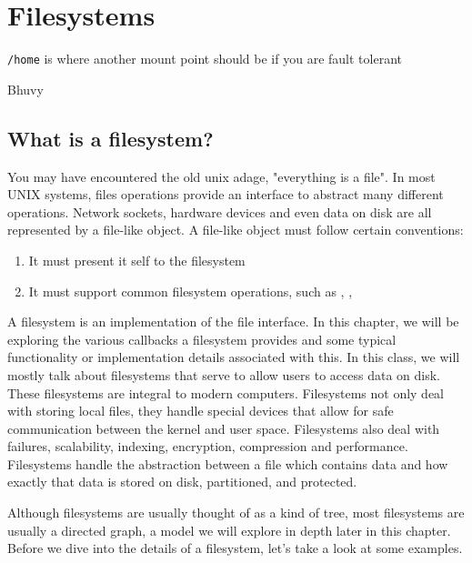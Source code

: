\chapter{Filesystems}

\epigraph{\texttt{/home} is where another mount point should be if you are fault tolerant}{Bhuvy}

\section{What is a filesystem?}

You may have encountered the old unix adage, "everything is a file". In most UNIX systems, files operations provide an interface to abstract many different operations. Network sockets, hardware devices and even data on disk are all represented by a file-like object. A file-like object must follow certain conventions:

\begin{enumerate}
  \item It must present it self to the filesystem
  \item It must support common filesystem operations, such as , , 
\end{enumerate}

A filesystem is an implementation of the file interface. In this chapter, we will be exploring the various callbacks a filesystem provides and some typical functionality or implementation details associated with this. In this class, we will mostly talk about filesystems that serve to allow users to access data on disk. These filesystems are integral to modern computers. Filesystems not only deal with storing local files, they handle special devices that allow for safe communication between the kernel and user space. Filesystems also deal with failures, scalability, indexing, encryption, compression and performance. Filesystems handle the abstraction between a file which contains data and how exactly that data is stored on disk, partitioned, and protected.

Although filesystems are usually thought of as a kind of tree, most filesystems are usually a directed graph, a model we will explore in depth later in this chapter. Before we dive into the details of a filesystem, let's take a look at some examples.

